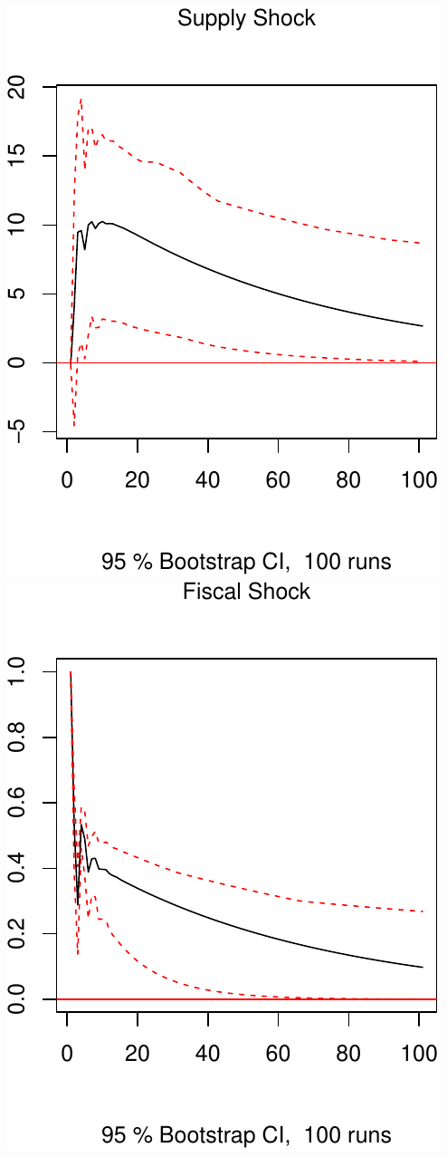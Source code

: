 \documentclass[11pt,preprint, authoryear]{elsarticle}
\numberwithin{equation}{section}
\numberwithin{figure}{section}
\numberwithin{table}{section}
\begin{document}
\includegraphics{TS_proj_files/figure-latex/unnamed-chunk-20-1.pdf}
\includegraphics{TS_proj_files/figure-latex/unnamed-chunk-20-2.pdf}
\end{document}
